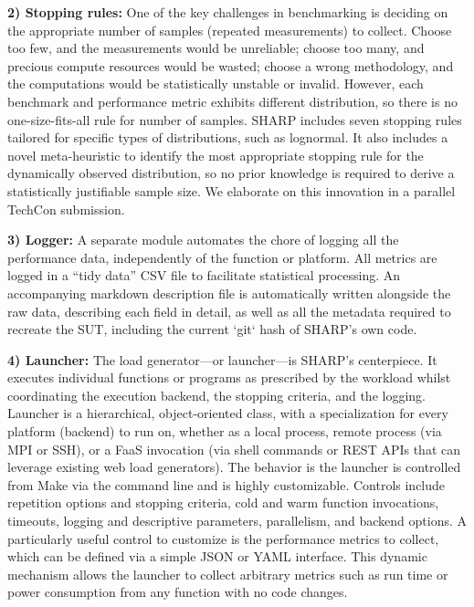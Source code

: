 \documentclass[11pt]{article}
\begin{document}
\textbf{2) Stopping rules:}
One of the key challenges in benchmarking is deciding on the appropriate number of samples (repeated measurements) to collect.
Choose too few, and the measurements would be unreliable; choose too many, and precious compute resources would be wasted; choose a wrong methodology, and the computations would be statistically unstable or invalid.
However, each benchmark and performance metric exhibits different distribution, so there is no one-size-fits-all rule for number of samples.
SHARP includes seven stopping rules tailored for specific types of distributions, such as lognormal.
It also includes a novel meta-heuristic to identify the most appropriate stopping rule for the dynamically observed distribution, so no prior knowledge is required to derive a statistically justifiable sample size.
We elaborate on this innovation in a parallel TechCon submission.

\textbf{3) Logger:}
A separate module automates the chore of logging all the performance data, independently of the function or platform.
All metrics are logged in a ``tidy data'' CSV file to facilitate statistical processing.
An accompanying markdown description file is automatically written alongside the raw data, describing each field in detail, as well as all the metadata required to recreate the SUT, including the current `git` hash of SHARP's own code.

\textbf{4) Launcher:}
The load generator---or launcher---is SHARP's centerpiece.
It executes individual functions or programs as prescribed by the workload whilst coordinating the execution backend, the stopping criteria, and the logging.
Launcher is a hierarchical, object-oriented class, with a specialization for every platform (backend) to run on, whether as a local process, remote process (via MPI or SSH), or a FaaS invocation (via shell commands or REST APIs that can leverage existing web load generators).
The behavior is the launcher is controlled from Make via the command line and is highly customizable.
Controls include repetition options and stopping criteria, cold and warm function invocations, timeouts, logging and descriptive parameters, parallelism, and backend options.
A particularly useful control to customize is the performance metrics to collect, which can be defined via a simple JSON or YAML interface.
This dynamic mechanism allows the launcher to collect arbitrary metrics such as run time or power consumption from any function with no code changes.
\end{document}
